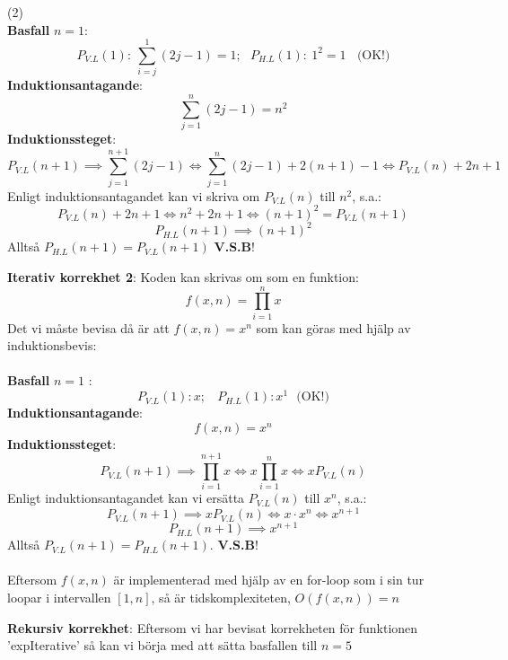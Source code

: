 \documentclass{report}
\begin{document}
\sol (2)\\
\textbf{Basfall} $n=1$:
\begin{equation*}
P_{V.L}(1):\:\sum_{i=j}^{1} (2j-1) = 1;\:\:\:P_{H.L}(1):\: 1^2 = 1\:\:\:\:\text{(OK!)}
\end{equation*}
\textbf{Induktionsantagande}:
\begin{equation*}
\sum_{j=1}^{n} (2j-1)= n^2
\end{equation*}
\textbf{Induktionssteget}:
\begin{equation*}
P_{V.L}(n+1) \implies \sum_{j=1}^{n+1}(2j-1) \iff \sum_{j=1}^{n}(2j-1) + 2(n+1)-1 \iff P_{V.L}(n) + 2n+1
\end{equation*}
Enligt induktionsantagandet kan vi skriva om $P_{V.L}(n)$ till $n^2$, s.a.:
\begin{equation*}
P_{V.L}(n) + 2n+1 \iff n^2 + 2n + 1 \iff (n+1)^2 = P_{V.L}(n+1)
\end{equation*}
\begin{equation*}
P_{H.L}(n+1) \implies (n+1)^2
\end{equation*}
Alltså $P_{H.L}(n+1) = P_{V.L}(n+1)$ \textbf{V.S.B}!

\pagebreak 

\qs{}
{
\textbf{Iterativ korrekhet 2}:
}
\sol Koden kan skrivas om som en funktion:
\begin{equation*}
	f(x, n) = \prod_{i = 1}^{n} x 
\end{equation*}
Det vi måste bevisa då är att $ f(x,n) = x^n $ som kan göras med hjälp av induktionsbevis:\\\\

\noindent
\textbf{Basfall} $ n = 1 $ :
\begin{equation*}
		P_{V.L}(1): x;\:\:\:\: P_{H.L}(1): x^1\:\:\: \text{(OK!)}   
\end{equation*}
\textbf{Induktionsantagande}:
\begin{equation*}
f(x,n) = x^n
\end{equation*}
\textbf{Induktionssteget}:
\begin{equation*}
	P_{V.L}(n+1) \implies \prod_{i=1}^{n+1}x \iff x\prod_{i=1}^{n}x \iff x P_{V.L}(n)
\end{equation*}
Enligt induktionsantagandet kan vi ersätta $ P_{V.L}(n) $ till $ x^n $, s.a.:
\begin{equation*}
	P_{V.L}(n+1) \implies xP_{V.L}(n) \iff x \cdot x^n \iff x^{n+1}
\end{equation*}
\begin{equation*}
	P_{H.L}(n+1) \implies x^{n+1}
\end{equation*}
Alltså $ P_{V.L}(n+1) = P_{H.L}(n+1) $. \textbf{V.S.B}!\\\\

\noindent
Eftersom $ f(x,n) $ är implementerad med hjälp av en for-loop som i sin tur loopar i intervallen $ [1,n] $, så är tidskomplexiteten, $ O(f(x,n)) = n $ 

\qs{}
{
\textbf{Rekursiv korrekhet}:
}
\sol Eftersom vi har bevisat korrekheten för funktionen 'expIterative' så kan vi börja med att sätta basfallen till $ n = 5 $  
\end{document}
